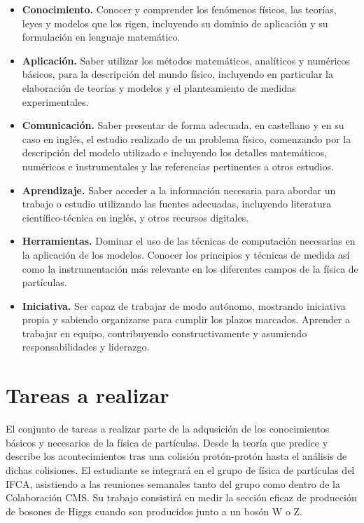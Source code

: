 \documentclass[11pt]{articulo}
\begin{document}
\begin{itemize}

\item{{\bf Conocimiento.} Conocer y comprender los fen\'omenos f\'isicos, las teor\'ias, leyes y modelos que los rigen, incluyendo su dominio de aplicaci\'on y su formulaci\'on en lenguaje matem\'atico.}

\item{{\bf Aplicaci\'on.} Saber utilizar los m\'etodos matem\'aticos, anal\'iticos y num\'ericos b\'asicos, para la descripci\'on del mundo f\'isico, incluyendo en particular la elaboraci\'on de teor\'ias y modelos y el planteamiento de medidas experimentales.}

\item{{\bf Comunicaci\'on.} Saber presentar de forma adecuada, en castellano y en su caso en ingl\'es, el estudio realizado de un problema f\'isico, comenzando por la descripci\'on del modelo utilizado e incluyendo los detalles matem\'aticos, num\'ericos e instrumentales y las referencias pertinentes a otros estudios.}

\item{{\bf Aprendizaje.} Saber acceder a la informaci\'on necesaria para abordar un trabajo o estudio utilizando las fuentes adecuadas, incluyendo literatura cient\'ifico-t\'ecnica en ingl\'es, y otros recursos digitales.}

\item{{\bf Herramientas.} Dominar el uso de las t\'ecnicas de computaci\'on necesarias en la aplicaci\'on de los modelos. Conocer los principios y t\'ecnicas de medida as\'i como la instrumentaci\'on m\'as relevante en los diferentes campos de la f\'isica de part\'iculas.}

\item{{\bf Iniciativa.} Ser capaz de trabajar de modo aut\'onomo, mostrando iniciativa propia y sabiendo organizarse para cumplir los plazos marcados. Aprender a trabajar en equipo, contribuyendo constructivamente y asumiendo responsabilidades y liderazgo.}

\end{itemize}

\section{Tareas a realizar} 

El conjunto de tareas a realizar parte de la adqusici\'on de los conocimientos b\'asicos y necesarios de la f\'isica de part\'iculas. Desde la teor\'ia que predice y describe los acontecimientos tras una colisi\'on prot\'on-prot\'on hasta el an\'alisis de dichas colisiones. El estudiante se integrar\'a en el grupo de f\'isica de part\'iculas del IFCA, asistiendo a las reuniones semanales tanto del grupo como dentro de la Colaboraci\'on CMS. Su trabajo consistir\'a en medir la secci\'on eficaz de producci\'on de bosones de Higgs cuando son producidos junto a un bos\'on W o Z.
\end{document}
